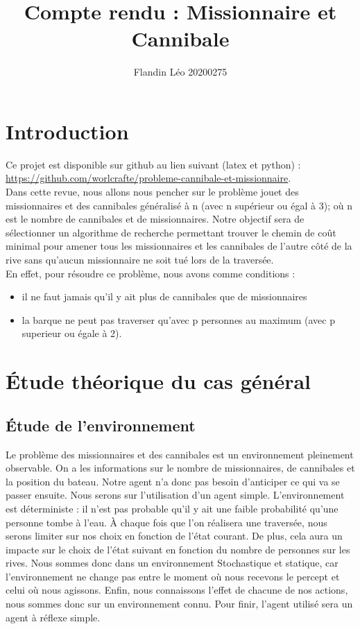 \documentclass[a4paper, 12pt, french, oneside]{book}
\title{Compte rendu : Missionnaire et Cannibale}
\author{Flandin Léo 20200275}
\begin{document}
\maketitle
\tableofcontents

\mainmatter

\chapter{Introduction}
Ce projet est disponible sur github au lien suivant (latex et python) : \\
\url{https://github.com/worlcrafte/probleme-cannibale-et-missionnaire}. \\
Dans cette revue, nous allons nous pencher sur le problème jouet des missionnaires et des cannibales généralisé à n (avec n supérieur ou égal à 3); où n est le nombre de cannibales et de missionnaires. Notre objectif sera de sélectionner un algorithme de recherche permettant trouver le chemin de coût minimal pour amener tous les missionnaires et les cannibales de l'autre côté de la rive sans qu'aucun missionnaire ne soit tué lors de la traversée. \\
En effet, pour résoudre ce problème, nous avons comme conditions :
\begin{itemize}
    \item il ne faut jamais qu'il y ait plus de cannibales que de missionnaires
    \item la barque ne peut pas traverser qu'avec p personnes au maximum (avec p superieur ou égale à 2).
\end{itemize}
\chapter{Étude théorique du cas général}

\section{Étude de l'environnement}
Le problème des missionnaires et des cannibales est un environnement pleinement observable. On a les informations sur le nombre de missionnaires, de cannibales et la position du bateau. Notre agent n'a donc pas besoin d'anticiper ce qui va se passer ensuite. Nous serons sur l'utilisation d'un agent simple. L'environnement est déterministe : il n'est pas probable qu'il y ait une faible probabilité qu'une personne tombe à l'eau. À chaque fois que l'on réalisera une traversée, nous serons limiter sur nos choix en fonction de l'état courant. De plus, cela aura un impacte sur le choix de l'état suivant en fonction du nombre de personnes sur les rives. Nous sommes donc dans un environnement Stochastique et statique, car l'environnement ne change pas entre le moment où nous recevons le percept et celui où nous agissons. Enfin, nous connaissons l'effet de chacune de nos actions, nous sommes donc sur un environnement connu. Pour finir, l'agent utilisé sera un agent à réflexe simple.
\end{document}
